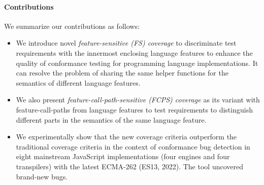 \paragraph{\textbf{Contributions}}
We summarize our contributions as follows:
\begin{itemize}
  \item
    We introduce novel \textit{feature-sensitive (FS) coverage} to discriminate
    test requirements with the innermost enclosing language features to enhance
    the quality of conformance testing for programming language implementations.
    It can resolve the problem of sharing the same helper
    functions for the semantics of different language features.
  \item 
    We also present \textit{feature-call-path-sensitive (FCPS) coverage} as its
    variant with feature-call-paths from language features to test requirements
    to distinguish different parts in the semantics of the same language feature.
  \item
    We experimentally show that the new coverage criteria outperform
    the traditional coverage criteria in the
    context of conformance bug detection in eight mainstream
    JavaScript implementations (four engines and four transpilers) with the latest ECMA-262
    (ES13, 2022). The tool uncovered  brand-new bugs.
\end{itemize}
